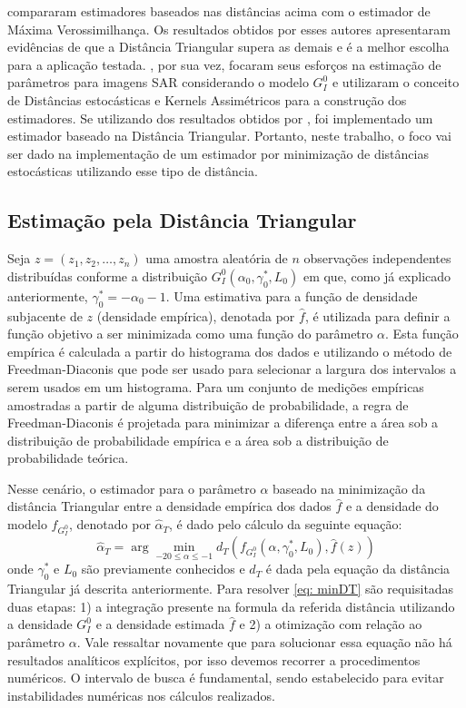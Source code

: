 \citet{Cassetti2013} compararam estimadores baseados nas distâncias acima com o estimador de Máxima Verossimilhança. Os resultados obtidos por esses autores apresentaram evidências de que a Distância Triangular supera as demais e é a melhor escolha para a aplicação testada. \citet{FreryStochasticDistances2015}, por sua vez, focaram seus esforços na estimação de parâmetros para imagens SAR considerando o modelo $G_I^0$ e utilizaram o conceito de Distâncias estocásticas e Kernels Assimétricos para a construção dos estimadores. Se utilizando dos resultados obtidos por \citet{Cassetti2013}, foi implementado um estimador baseado na Distância Triangular. Portanto, neste trabalho, o foco vai ser dado na implementação de um estimador por minimização de distâncias estocásticas utilizando esse tipo de distância.

\subsection{Estimação pela Distância Triangular}

Seja $z = (z_1, z_2, \dots, z_n)$ uma amostra aleatória de $n$ observações independentes distribuídas conforme a distribuição $G_I^0(\alpha_0, \gamma_0^{*}, L_0)$ em que, como já explicado anteriormente, $\gamma_0^{*} = - \alpha_0 - 1$. Uma estimativa para a função de densidade subjacente de $z$ (densidade empírica), denotada por $\widehat{f}$, é utilizada para definir a função objetivo a ser minimizada como uma função do parâmetro $\alpha$. Esta função empírica é calculada a partir do histograma dos dados e utilizando o método de Freedman-Diaconis que pode ser usado para selecionar a largura dos intervalos a serem usados em um histograma. Para um conjunto de medições empíricas amostradas a partir de alguma distribuição de probabilidade, a regra de Freedman-Diaconis \citep{FreedmanDiaconis} é projetada para minimizar a diferença entre a área sob a distribuição de probabilidade empírica e a área sob a distribuição de probabilidade teórica. 

Nesse cenário, o estimador para o parâmetro $\alpha$ baseado na minimização da distância Triangular entre a densidade empírica dos dados $\widehat{f}$ e a densidade do modelo $f_{G_I^0}$, denotado por $\widehat{\alpha}_{T}$, é dado pelo cálculo da seguinte equação:
\begin{equation}
    \widehat{\alpha}_{T} = \arg\min_{-20 \leq \alpha \leq -1} d_T(f_{G_I^0}(\alpha, \gamma_0^{*}, L_0), \widehat{f}(z)) 
    \label{eq: minDT}
\end{equation}
onde $\gamma_0^{*}$ e $L_0$ são previamente conhecidos e $d_T$ é dada pela equação da distância Triangular já descrita anteriormente. Para resolver \eqref{eq: minDT} são requisitadas duas etapas: 1) a integração presente na formula da referida distância utilizando a densidade $G_I^0$ e a densidade estimada $\widehat{f}$ e 2) a otimização com relação ao parâmetro $\alpha$. Vale ressaltar novamente que para solucionar essa equação não há resultados analíticos explícitos, por isso devemos recorrer a procedimentos numéricos. O intervalo de busca é fundamental, sendo estabelecido para evitar instabilidades numéricas nos cálculos realizados.



